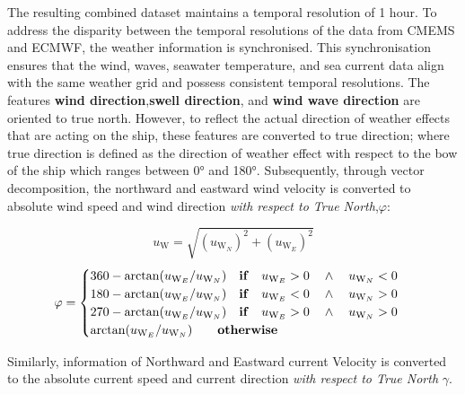 \pagebreak

The resulting combined dataset maintains a temporal resolution of 1 hour. To address the disparity between the temporal resolutions of the data from CMEMS and ECMWF, the weather information is synchronised. This synchronisation ensures that the wind, waves, seawater temperature, and sea current data align with the same weather grid and possess consistent temporal resolutions. The features \textbf{wind direction},\textbf{swell direction}, and \textbf{wind wave direction} are oriented to true north. However, to reflect the actual direction of weather effects that are acting on the ship, these features are converted to true direction; where true direction is defined as the direction of weather effect with respect to the bow of the ship which ranges between 0° and 180°. Subsequently, through vector decomposition, the northward and eastward wind velocity is converted to absolute wind speed and wind direction \emph{with respect to True North},$\varphi$:

\begin{equation}\label{eqn:vwindabs}
    u_{\text{W}} = \sqrt{(u_{\text{W}_{N}})^2 + (u_{\text{W}_{E}})^2} 
\end{equation}
\begin{equation}\label{eqn:winddir}
    \varphi = 
    \begin{cases}
        360 - \arctan(u_{\text{W}_{E}} / u_{\text{W}_{N}}) \quad \text{\textbf{if}} \quad u_{\text{W}_{E}} > 0 \quad \wedge \quad u_{\text{W}_{N}} < 0 \\ 
        180 - \arctan(u_{\text{W}_{E}} / u_{\text{W}_{N}}) \quad \text{\textbf{if}} \quad u_{\text{W}_{E}} < 0 \quad \wedge \quad u_{\text{W}_{N}} > 0 \\ 
        270 - \arctan(u_{\text{W}_{E}} / u_{\text{W}_{N}}) \quad \text{\textbf{if}} \quad u_{\text{W}_{E}} > 0 \quad \wedge \quad u_{\text{W}_{N}} > 0 \\
        \arctan(u_{\text{W}_{E}} / u_{\text{W}_{N}}) \qquad \text{\textbf{otherwise}} 
    \end{cases}   
\end{equation}

Similarly, information of Northward and Eastward current Velocity is converted to the absolute current speed and current direction \emph{with respect to True North} $\gamma$.\\ 

